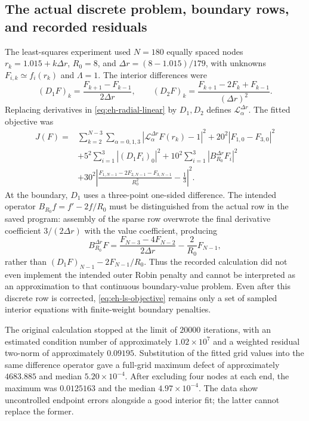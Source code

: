 \documentclass[a4paper,11pt]{article}
\numberwithin{equation}{section}
\theoremstyle{definition}
\begin{document}
\subsection{The actual discrete problem, boundary rows, and recorded residuals}
The least-squares experiment used $N=180$ equally spaced nodes
$r_k=1.015+k\Delta r$, $R_0=8$, and $\Delta r=(8-1.015)/179$,
with unknowns $F_{i,k}\simeq f_i(r_k)$ and $\Lambda=1$.
The interior differences were
\[
(D_1F)_k=\frac{F_{k+1}-F_{k-1}}{2\Delta r},\qquad
(D_2F)_k=\frac{F_{k+1}-2F_k+F_{k-1}}{(\Delta r)^2}.
\]
Replacing derivatives in \eqref{eq:eh-radial-linear} by $D_1,D_2$ defines
$\mathscr L_\alpha^{\Delta r}$. The fitted objective was
\begin{align}
J(F)={}&\sum_{k=2}^{N-3}\sum_{\alpha=0,1,3}
|\mathscr L_\alpha^{\Delta r}F(r_k)-1|^2
+20^2|F_{1,0}-F_{3,0}|^2\nonumber\\
&+5^2\sum_{i=1}^3|(D_1F_i)_0|^2
+10^2\sum_{i=1}^3|B_{R_0}^{\Delta r}F_i|^2\label{eq:eh-ls-objective}\\
&+30^2\left|\frac{F_{1,N-1}-2F_{2,N-1}-F_{3,N-1}}{R_0^2}
-\frac13\right|^2.\nonumber
\end{align}
At the boundary, $D_1$ uses a three-point one-sided difference.
The intended operator $B_{R_0}f=f'-2f/R_0$ must be distinguished from the actual row in the saved program:
assembly of the sparse row overwrote the final derivative coefficient $3/(2\Delta r)$ with the value coefficient, producing
\begin{equation}\label{eq:eh-ls-boundary}
B_{R_0}^{\Delta r}F
=\frac{F_{N-3}-4F_{N-2}}{2\Delta r}-\frac2{R_0}F_{N-1},
\end{equation}
rather than $(D_1F)_{N-1}-2F_{N-1}/R_0$.
Thus the recorded calculation did not even implement the intended outer Robin penalty and cannot be interpreted as an approximation to that continuous boundary-value problem.
Even after this discrete row is corrected, \eqref{eq:eh-ls-objective} remains only a set of sampled interior equations with finite-weight boundary penalties.

The original calculation stopped at the limit of $20000$ iterations, with an estimated condition number of approximately $1.02\times10^7$
and a weighted residual two-norm of approximately $0.09195$. Substitution of the fitted grid values into the same difference operator
gave a full-grid maximum defect of approximately $4683.885$ and median $5.20\times10^{-4}$.
After excluding four nodes at each end, the maximum was $0.0125163$ and the median $4.97\times10^{-4}$.
The data show uncontrolled endpoint errors alongside a good interior fit; the latter cannot replace the former.
\end{document}
